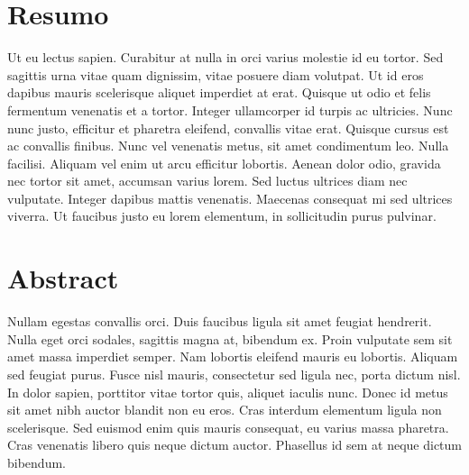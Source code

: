 
\chapter*{Resumo}
Ut eu lectus sapien. Curabitur at nulla in orci varius molestie id eu tortor. Sed sagittis urna vitae quam dignissim, vitae posuere diam volutpat. Ut id eros dapibus mauris scelerisque aliquet imperdiet at erat. Quisque ut odio et felis fermentum venenatis et a tortor. Integer ullamcorper id turpis ac ultricies. Nunc nunc justo, efficitur et pharetra eleifend, convallis vitae erat. Quisque cursus est ac convallis finibus. Nunc vel venenatis metus, sit amet condimentum leo. Nulla facilisi. Aliquam vel enim ut arcu efficitur lobortis. Aenean dolor odio, gravida nec tortor sit amet, accumsan varius lorem. Sed luctus ultrices diam nec vulputate. Integer dapibus mattis venenatis. Maecenas consequat mi sed ultrices viverra. Ut faucibus justo eu lorem elementum, in sollicitudin purus pulvinar.

\chapter*{Abstract}
Nullam egestas convallis orci. Duis faucibus ligula sit amet feugiat hendrerit. Nulla eget orci sodales, sagittis magna at, bibendum ex. Proin vulputate sem sit amet massa imperdiet semper. Nam lobortis eleifend mauris eu lobortis. Aliquam sed feugiat purus. Fusce nisl mauris, consectetur sed ligula nec, porta dictum nisl. In dolor sapien, porttitor vitae tortor quis, aliquet iaculis nunc. Donec id metus sit amet nibh auctor blandit non eu eros. Cras interdum elementum ligula non scelerisque. Sed euismod enim quis mauris consequat, eu varius massa pharetra. Cras venenatis libero quis neque dictum auctor. Phasellus id sem at neque dictum bibendum.